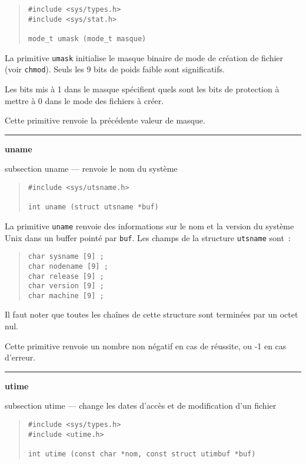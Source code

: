 \documentclass [twoside] {report}
\newcommand {\primitive} [1]
    {
	{\large \bf #1}
	\addcontentsline {toc} {subsection} {#1}
    }
\newcommand {\separation}
    {
	\vspace {7mm}
	\nopagebreak
	\hrule
    }
\begin{document}
\begin {quote}
\begin {verbatim}
#include <sys/types.h>
#include <sys/stat.h>

mode_t umask (mode_t masque)
\end{verbatim}
\end {quote}

La primitive {\tt umask} initialise le masque
binaire de mode de création de fichier (voir {\tt chmod}).
Seuls les 9
bits de poids faible sont significatifs.

Les bits mis à 1 dans le masque spécifient quels
sont les bits de protection à mettre à 0 dans le
mode des fichiers à créer.

Cette primitive renvoie la précédente valeur de
masque.




\separation
\primitive {uname} --- renvoie le nom du système

\begin {quote}
\begin {verbatim}
#include <sys/utsname.h>

int uname (struct utsname *buf)
\end{verbatim}
\end {quote}

La primitive {\tt uname} renvoie des informations
sur le nom et la version du système Unix dans un
buffer pointé par {\tt buf}. Les champs de la
structure {\tt utsname} sont~:

\begin {quote}
\begin {verbatim}
char sysname [9] ;
char nodename [9] ;
char release [9] ;
char version [9] ;
char machine [9] ;
\end{verbatim}
\end {quote}

Il faut noter que toutes les chaînes de cette
structure sont terminées par un octet nul.

Cette primitive renvoie un nombre non négatif en
cas de réussite, ou -1 en cas d'erreur.




\separation
\primitive {utime} --- change les dates d'accès et de modification d'un fichier

\begin {quote}
\begin {verbatim}
#include <sys/types.h>
#include <utime.h>

int utime (const char *nom, const struct utimbuf *buf)
\end{verbatim}
\end {quote}
\end{document}
